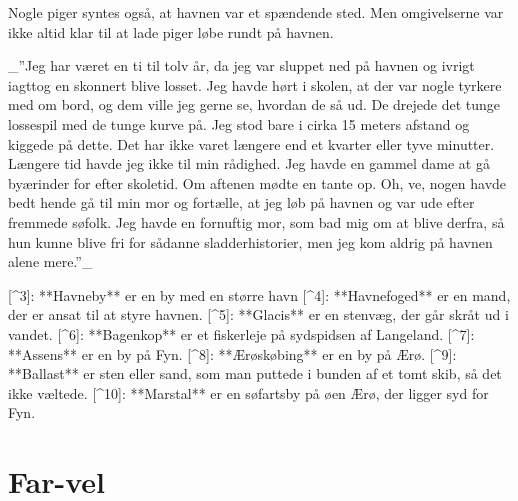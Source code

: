 \documentclass{book}
\begin{document}

Nogle piger syntes også, at havnen var et spændende sted. Men omgivelserne var
ikke altid klar til at lade piger løbe rundt på havnen.

 _”Jeg har været en ti til tolv år, da jeg var sluppet ned på havnen og ivrigt
iagttog en skonnert blive losset. Jeg havde hørt i skolen, at der var nogle tyrkere
med om bord, og dem ville jeg gerne se, hvordan de så ud. De drejede det tunge
lossespil med de tunge kurve på. Jeg stod bare i cirka 15 meters afstand og kiggede
på dette. Det har ikke varet længere end et kvarter eller tyve minutter. Længere
tid havde jeg ikke til min rådighed. Jeg havde en gammel dame at gå byærinder for
efter skoletid. Om aftenen mødte en tante op. Oh, ve, nogen havde bedt hende gå
til min mor og fortælle, at jeg løb på havnen og var ude efter fremmede søfolk.
Jeg havde en fornuftig mor, som bad mig om at blive derfra, så hun kunne blive fri
for sådanne sladderhistorier, men jeg kom aldrig på havnen alene mere.”_



[^3]: **Havneby** er en by med en større havn
[^4]: **Havnefoged** er en mand, der er ansat til at styre havnen.
[^5]: **Glacis** er en stenvæg, der går skråt ud i vandet.
[^6]: **Bagenkop** er et fiskerleje på sydspidsen af Langeland.
[^7]: **Assens** er en by på Fyn.
[^8]: **Ærøskøbing** er en by på Ærø.
[^9]: **Ballast** er sten eller sand, som man puttede i bunden af et tomt skib,
      så det ikke væltede.
[^10]: **Marstal** er en søfartsby på øen Ærø, der ligger syd for Fyn.

\chapter{Far-vel}
\end{document}
